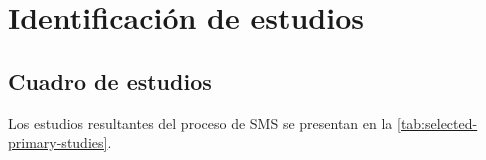\section{Identificación de estudios}
\subsection{Cuadro de estudios}

Los estudios resultantes del proceso de \ac{SMS} se presentan en la \autoref{tab:selected-primary-studies}.


